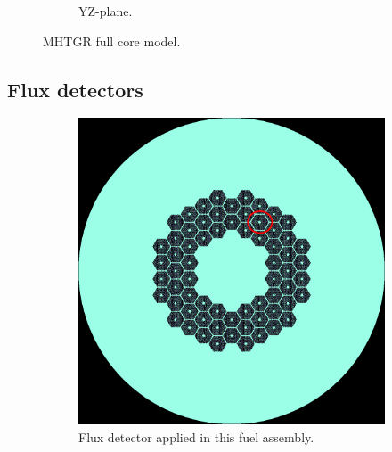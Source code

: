 \documentclass[11pt,letterpaper]{article}
\begin{document}
\begin{figure}[]
\begin{subfigure}[t]{0.4\textwidth}
			\caption{YZ-plane.}
		\end{subfigure}
		\hfill
		\caption{MHTGR full core model.}
		\label{fig:fullcore}
	\end{figure}

\subsection{Flux detectors}

	\begin{figure}[]
		\centering
		\begin{subfigure}[t]{0.4\textwidth}
			\centering
			\includegraphics[width=\linewidth]{figures/axial-detector.png}
			\caption{Flux detector applied in this fuel assembly.}
		\end{subfigure}
		\begin{subfigure}[t]{0.4\textwidth}
			\centering

\end{subfigure}
\end{figure}
\end{document}
